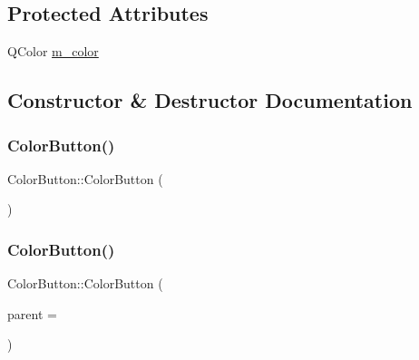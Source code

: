 \subsection*{Protected Attributes}
\begin{DoxyCompactItemize}
\item 
Q\+Color \hyperlink{class_color_button_aa4408cd251575659e5e8417802f276e4}{m\+\_\+color}
\end{DoxyCompactItemize}


\subsection{Constructor \& Destructor Documentation}
\mbox{\label{class_color_button_a4b8e318941c5c69efd5a610fd7edb51e}} 
\subsubsection{\texorpdfstring{Color\+Button()}{ColorButton()}\hspace{0.1cm}{\footnotesize\ttfamily [1/3]}}
{\footnotesize\ttfamily Color\+Button\+::\+Color\+Button (\begin{DoxyParamCaption}{ }\end{DoxyParamCaption})}

\mbox{\label{class_color_button_a128b21900f22efdc9d71d0bffa0b64f8}} 
\subsubsection{\texorpdfstring{Color\+Button()}{ColorButton()}\hspace{0.1cm}{\footnotesize\ttfamily [2/3]}}
{\footnotesize\ttfamily Color\+Button\+::\+Color\+Button (\begin{DoxyParamCaption}\item[{Q\+Widget $\ast$}]{parent = {} }\end{DoxyParamCaption})}

\mbox{\label{class_color_button_a16f9cc31b3476fc5cb900e3692d4f49c}} 
